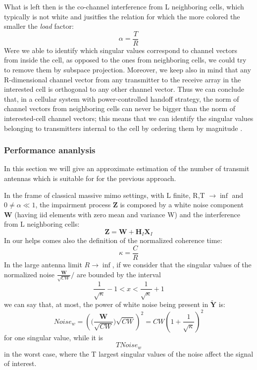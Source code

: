 \documentclass[11pt]{book}
\begin{document}
What is left then is the co-channel interference from L neighboring cells, which typically is not white and jusitfies the relation for which the more colored the smaller the \textit{load} factor:
\begin{equation}
  \alpha = \frac{T}{R}
\end{equation}
Were we able to identify which singular values correspond to channel vectors from inside the cell, as opposed to the ones from neighboring cells, we could try to remove them by subspace projection. Moreover, we keep also in mind that any R-dimensional channel vector from any transmitter to the receive array in the interested cell is orthogonal to any other channel vector. Thus we can conclude that, in a cellular system with power-controlled handoff strategy, the norm of channel vectors from neighboring cells can never be bigger than the norm of interested-cell channel vectors; this means that we can identify the singular values belonging to transmitters internal to the cell by ordering them by magnitude \cite{Ralf}.
\subsubsection{Performance ananlysis}
In this section we will give an approximate estimation of the number of transmit antennas which is suitable for for the previous approach.

In the frame of classical massive \gls{mimo} settings, with L finite, R,T $\rightarrow \inf$ and $0 \neq \alpha \ll 1$, the impairment process $\mathbf{Z}$ is composed by a white noise component $\mathbf{W}$ (having iid elements with zero mean and variance W) and the interference from L neighboring cells:
\begin{equation}
  \mathbf{Z} = \mathbf{W} + \mathbf{H}_I\mathbf{X}_I
\end{equation}
In our helps comes also the definition of the normalized coherence time:
\begin{equation}
  \kappa = \frac{C}{R}
\end{equation}
In the large antenna limit $R \rightarrow \inf$, if we consider that the singular values of the normalized noise $\frac{\mathbf{W}}{\sqrt{CW}}/$ are bounded by the interval
\begin{equation}
  \frac{1}{\sqrt{\kappa}} - 1 < x < \frac{1}{\sqrt{\kappa}} + 1
\end{equation}
we can say that, at most, the power of white noise being present in $\mathbf{\tilde{Y}}$ is:
\begin{equation}
  Noise_w = \left(\Big(\frac{\mathbf{W}}{\sqrt{CW}}\Big)\sqrt{CW}\right)^2 = CW\left(1+\frac{1}{\sqrt{\kappa}}\right)^2
\end{equation}
for one singular value, while it is
\begin{equation}
  TNoise_w
\end{equation}
in the worst case, where the T largest singular values of the noise affect the signal of interest.
\end{document}
